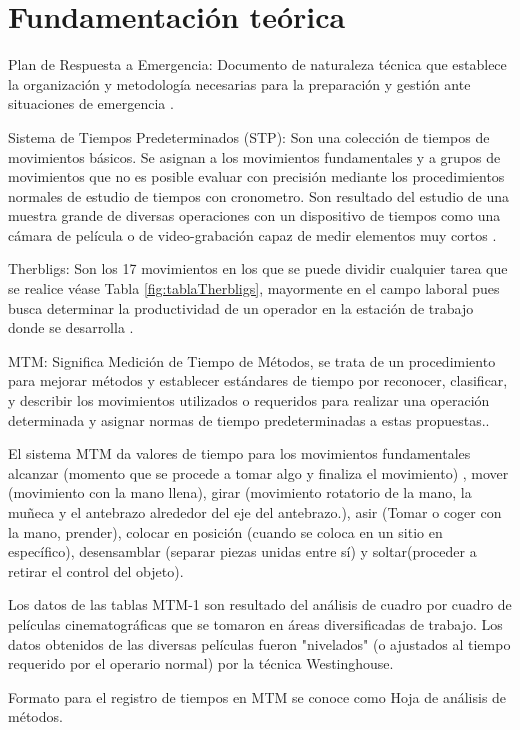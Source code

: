     \section{Fundamentación teórica}
    Plan de Respuesta a Emergencia: Documento de naturaleza técnica que establece la organización y metodología necesarias para la preparación y gestión ante situaciones de emergencia \cite{vra_ucr_emergencias}.
    
    Sistema de Tiempos Predeterminados (STP): Son una colección de tiempos de movimientos básicos. Se asignan a los movimientos fundamentales y a grupos de movimientos que no es posible evaluar con precisión mediante los procedimientos normales de estudio de tiempos con cronometro. Son resultado del estudio de una muestra grande de diversas operaciones con un dispositivo de tiempos como una cámara de película o de video-grabación capaz de medir elementos muy cortos \cite{STP}.
    
    Therbligs: Son los 17 movimientos en los que se puede dividir cualquier tarea que se realice véase Tabla \ref{fig:tablaTherbligs}, mayormente en el campo laboral pues busca determinar la productividad de un operador en la estación de trabajo donde se desarrolla \cite{Therbligs}.
    
    MTM: Significa Medición de Tiempo de Métodos, se trata de un procedimiento para mejorar métodos y establecer estándares de tiempo por reconocer, clasificar, y describir los movimientos utilizados o requeridos para realizar una operación determinada y asignar normas de tiempo predeterminadas a estas propuestas.\cite{MTM}.
    
    El sistema MTM da valores de tiempo para los movimientos fundamentales alcanzar (momento que se procede a tomar algo y finaliza el movimiento) , mover (movimiento con la mano llena), girar (movimiento rotatorio de la mano, la muñeca y el antebrazo alrededor del eje del antebrazo.), asir (Tomar o coger con la mano, prender), colocar en posición (cuando se coloca en un sitio en específico), desensamblar (separar piezas unidas entre sí) y soltar(proceder a retirar el control del objeto).
    
    Los datos de las tablas MTM-1 son resultado del análisis de cuadro por cuadro de películas cinematográficas que se tomaron en áreas diversificadas de trabajo. Los datos obtenidos de las diversas películas fueron "nivelados" (o ajustados al tiempo requerido por el operario normal) por la técnica Westinghouse.
    
    Formato para el registro de tiempos en MTM se conoce como Hoja de análisis de métodos.
    
